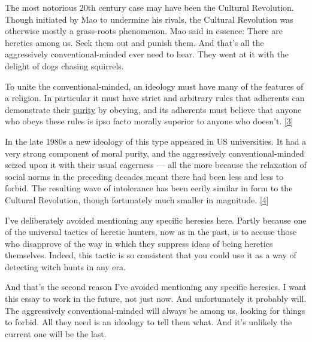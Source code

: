 The
                  most notorious 20th century case may have been the Cultural
                  Revolution. Though initiated by Mao to undermine his rivals,
                  the Cultural Revolution was otherwise mostly a grass-roots
                  phenomenon. Mao said in essence: There are heretics among us.
                  Seek them out and punish them. And that's all the aggressively
                  conventional-minded ever need to hear. They went at it with
                  the delight of dogs chasing squirrels.

To unite the
                  conventional-minded, an ideology must have many of the
                  features of a religion. In particular it must have strict and
                  arbitrary rules that adherents can demonstrate their
                  \href{https://www.youtube.com/watch?v=qaHLd8de6nM}{\underline{purity}}
                  by obeying, and its adherents must believe that anyone who
                  obeys these rules is ipso facto morally superior to anyone who
                  doesn't.
                  [\href{\#f3n}{3}]

In the late 1980s a new ideology of this type
                  appeared in US universities. It had a very strong component of
                  moral purity, and the aggressively conventional-minded seized
                  upon it with their usual eagerness --- all the more
                  because the relaxation of social norms in the preceding
                  decades meant there had been less and less to forbid. The
                  resulting wave of intolerance has been eerily similar in form
                  to the Cultural Revolution, though fortunately much smaller in
                  magnitude.
                  [\href{\#f4n}{4}]

I've deliberately avoided mentioning any specific
                  heresies here. Partly because one of the universal tactics of
                  heretic hunters, now as in the past, is to accuse those who
                  disapprove of the way in which they suppress ideas of being
                  heretics themselves. Indeed, this tactic is so consistent that
                  you could use it as a way of detecting witch hunts in any
                  era.

And that's the second reason I've avoided
                  mentioning any specific heresies. I want this essay to work in
                  the future, not just now. And unfortunately it probably will.
                  The aggressively conventional-minded will always be among us,
                  looking for things to forbid. All they need is an ideology to
                  tell them what. And it's unlikely the current one will be the
                  last.

